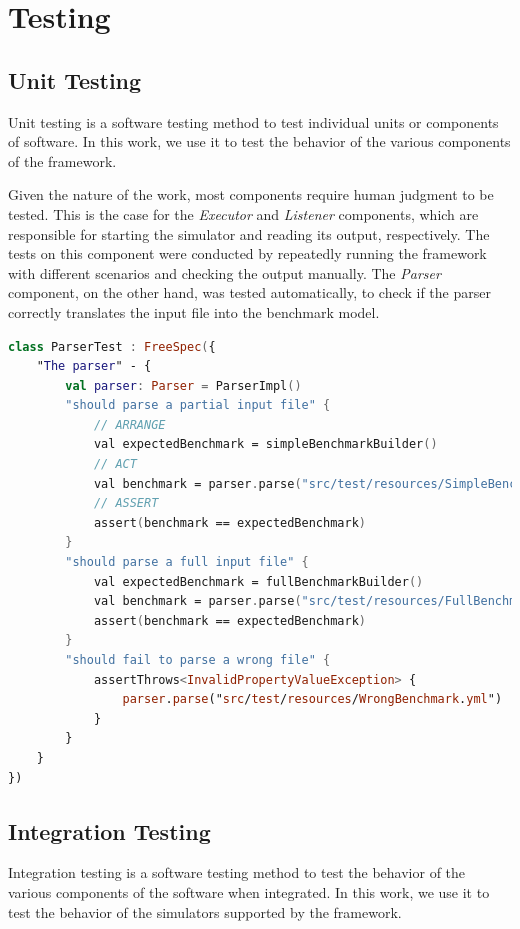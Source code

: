 \documentclass[12pt,a4paper,openright,twoside]{book}
\begin{document}
\section{Testing}

\subsection*{Unit Testing}
Unit testing is a software testing method to test individual units or components of software.
In this work, we use it to test the behavior of the various components of the framework.

Given the nature of the work, most components require human judgment to be tested. 
This is the case for the \emph{Executor} and \emph{Listener} components, which are responsible for starting the simulator and reading its output, respectively.
The tests on this component were conducted by repeatedly running the framework with different scenarios and checking the output manually.
The \emph{Parser} component, on the other hand, was tested automatically, to check if the parser correctly translates the input file into the benchmark model.

\begin{lstlisting}[language=kt]
  class ParserTest : FreeSpec({
    "The parser" - {
        val parser: Parser = ParserImpl()
        "should parse a partial input file" {
            // ARRANGE
            val expectedBenchmark = simpleBenchmarkBuilder()
            // ACT
            val benchmark = parser.parse("src/test/resources/SimpleBenchmark.yml")
            // ASSERT
            assert(benchmark == expectedBenchmark)
        }
        "should parse a full input file" {
            val expectedBenchmark = fullBenchmarkBuilder()
            val benchmark = parser.parse("src/test/resources/FullBenchmark.yml")
            assert(benchmark == expectedBenchmark)
        }
        "should fail to parse a wrong file" {
            assertThrows<InvalidPropertyValueException> {
                parser.parse("src/test/resources/WrongBenchmark.yml")
            }
        }
    }
})
\end{lstlisting}

\subsection*{Integration Testing}

Integration testing is a software testing method to test the behavior of the various components of the software when integrated.
In this work, we use it to test the behavior of the simulators supported by the framework.
\end{document}
